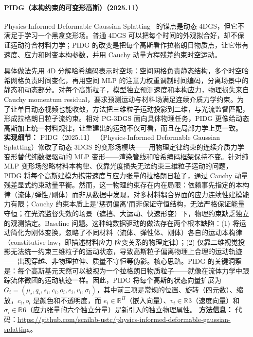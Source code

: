 \paragraph{PIDG（本构约束的可变形高斯）（2025.11）}
Physics-Informed Deformable Gaussian Splatting~\cite{2511_06299} 的锚点是动态 4DGS，但它不满足于学习一个黑盒变形场。普通 4DGS 可以把每个时间的外观拟合好，却不保证运动符合材料力学；PIDG 的改变是把每个高斯看作拉格朗日物质点，让它带有速度、应力和时变本构参数，并用 Cauchy 动量方程残差约束时空运动。

具体做法先用 4D 分解哈希编码表示时空场：空间网格负责静态结构，多个时空哈希网格负责时间变化，再用空间 MLP 的注意力权重调制时间编码，分离场景中的静态和动态部分。对每个高斯粒子，模型独立预测速度和本构应力，物理损失来自 Cauchy momentum residual，要求预测运动与材料场满足连续介质力学约束。为了让单目动态视频也能收敛，方法把三维粒子运动投影到二维，与光流监督匹配，形成拉格朗日粒子流约束。相对 PG-3DGS 面向具体物理任务，PIDG 更像给动态高斯加上统一材料规律，让重建出的运动不仅可看，而且在局部力学上更一致。
\textbf{实现细节：} PIDG（2025.11） （Physics-Informed Deformable Gaussian Splatting）修改了动态 3DGS 的变形场模块——用物理定律约束的连续介质力学变形替代纯数据驱动的 MLP 变形——渲染管线和哈希编码框架保持不变。针对纯 MLP 变形场忽略材料本构律、仅靠光度损失无法约束三维粒子运动的问题，PIDG 将每个高斯建模为携带速度与应力张量的拉格朗日粒子，通过 Cauchy 动量残差显式约束动量平衡。然而，这一物理约束存在内在局限：依赖事先指定的本构律（流体/弹性/刚体）而非从数据中发现，对多材料耦合界面的应力连续性建模能力有限；Cauchy 约束本质上是"惩罚偏离"而非保证守恒结构，无法严格保证能量守恒；在光流监督失效的场景（遮挡、大运动、快速形变）下，物理约束缺乏独立的观测锚定。Baseline 问题。这种纯数据驱动的做法存在两个根本缺陷：(1) 将运动简化为刚体变换，忽略了不同材料（流体、弹性体、刚体）各自的运动本构律（constitutive law，即描述材料应力-应变关系的物理定律）；(2) 仅靠二维视觉投影无法统一约束三维粒子的运动状态，导致高斯粒子偏离物理上合理的运动轨迹——出现穿越、非物理拉伸、质量不守恒等伪影。核心思路。PIDG 的关键洞察是：每个高斯基元天然可以被视为一个拉格朗日物质粒子——就像在流体力学中跟踪流体微团的运动轨迹一样。因此，PIDG 将每个高斯的状态向量扩展为 $G_i = (\mu_i, q_i, s_i, c_i, o_i, e_i, v_i, \sigma_i)$，其中前三项是常规的位置、旋转（四元数）、缩放，$c_i, o_i$ 是颜色和不透明度，而 $e_i \in \mathbb{R}^H$（嵌入向量）、$v_i \in \mathbb{R}^{}3$（速度向量）和 $\sigma_i \in \mathbb{R}^{}6$（应力张量的六个独立分量）是新引入的独立物理属性。
\textbf{方法信息：} 代码：\url{https://github.com/scailab-ustc/physics-informed-deformable-gaussian-splatting}。
